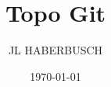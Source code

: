 \usepackage[utf8]{inputenc}       %
\usepackage[T1]{fontenc}          %
\usepackage[francais]{babel}      %
\usepackage{fullpage}			  %
							      
\usepackage{float}
\usepackage[xindy]{glossaries}
\makeglossaries

\usepackage{graphicx}		      %
\usepackage{fullpage}
\usepackage{eso-pic}
                                  
\usepackage{listings}             %
 
\newcommand{\HRule}{\rule{\linewidth}{0.5mm}}
 
\newcommand{\blap}[1]{\vbox to 0pt{#1\vss}}
\newcommand\AtUpperLeftCorner[3]{%
  \put(\LenToUnit{#1},\LenToUnit{\dimexpr\paperheight-#2}){\blap{#3}}%
}
\newcommand\AtUpperRightCorner[3]{%
  \put(\LenToUnit{\dimexpr\paperwidth-#1},\LenToUnit{\dimexpr\paperheight-#2}){\blap{\llap{#3}}}%
}
\title{\LARGE{Topo Git}}           		%
\author{JL HABERBUSCH}			%
\date{\today}                   %
\makeatletter